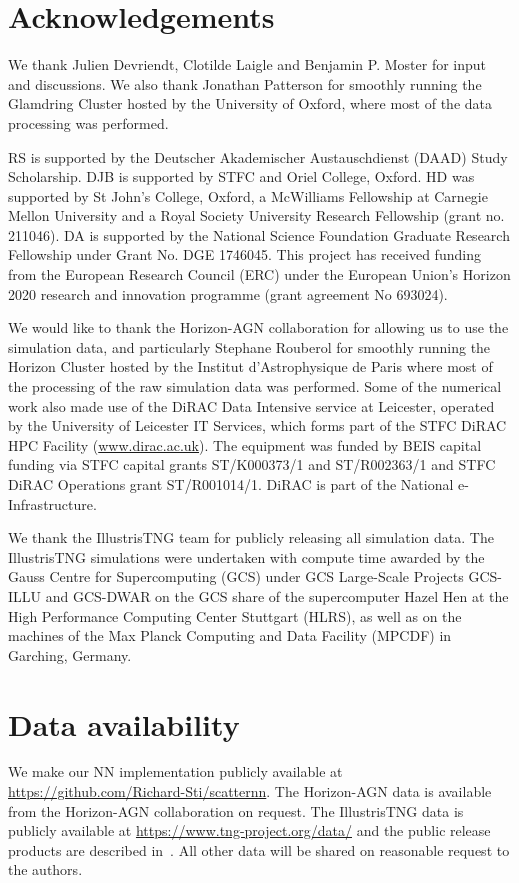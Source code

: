 \documentclass[usenatbib,useAMS]{mnras}
\begin{document}
\section*{Acknowledgements}

We thank Julien Devriendt, Clotilde Laigle and Benjamin P. Moster for input and discussions. We also thank Jonathan Patterson for smoothly running the Glamdring Cluster hosted by the University of Oxford, where most of the data processing was performed.

RS is supported by the Deutscher Akademischer Austauschdienst (DAAD) Study Scholarship. DJB is supported by STFC and Oriel College, Oxford. HD was supported by St John's College, Oxford, a McWilliams Fellowship at Carnegie Mellon University and a Royal Society University Research Fellowship (grant no. 211046). DA is supported by the National Science Foundation Graduate Research Fellowship under Grant No. DGE 1746045. This project has received funding from the European Research Council (ERC) under the European Union’s Horizon 2020 research and innovation programme (grant agreement No 693024).

We would like to thank the Horizon-AGN collaboration for allowing us to use the simulation data, and particularly Stephane Rouberol for smoothly running the Horizon Cluster hosted by the Institut d'Astrophysique de Paris where most of the processing of the raw simulation data was performed. Some of the numerical work also made use of the DiRAC Data Intensive service at Leicester, operated by the University of Leicester IT Services, which forms part of the STFC DiRAC HPC Facility (\url{www.dirac.ac.uk}). The equipment was funded by BEIS capital funding via STFC capital grants ST/K000373/1 and ST/R002363/1 and STFC DiRAC Operations grant ST/R001014/1. DiRAC is part of the National e-Infrastructure.

We thank the IllustrisTNG team for publicly releasing all simulation data. The IllustrisTNG simulations were undertaken with compute time awarded by the Gauss Centre for Supercomputing (GCS) under GCS Large-Scale Projects GCS-ILLU and GCS-DWAR on the GCS share of the supercomputer Hazel Hen at the High Performance Computing Center Stuttgart (HLRS), as well as on the machines of the Max Planck Computing and Data Facility (MPCDF) in Garching, Germany.

\section*{Data availability}
We make our \ac{NN} implementation publicly available at \url{https://github.com/Richard-Sti/scatternn}. The Horizon-AGN data is available from the Horizon-AGN collaboration on request. The IllustrisTNG data is publicly available at \url{https://www.tng-project.org/data/} and the public release products are described in~\citet{Nelson_2019}. All other data will be shared on reasonable request to the authors.


\appendix




\label{lastpage}
\end{document}
